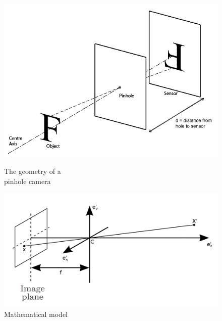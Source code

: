\begin{figure}[t!]
  \centering
  \begin{minipage}[c]{.48\textwidth}
  	\centering
    \includegraphics[width=\textwidth]{./images/tech/pinhole.png}
    \caption{The geometry of a \\ pinhole camera}
    \label{fig::pinhole}
  \end{minipage}
  \hfill
  \begin{minipage}[c]{.48\textwidth}
  	\centering
    \includegraphics[width=\textwidth]{./images/tech/image_plane.png}
    \caption{Mathematical model}
    \label{fig:math_model}
  \end{minipage}
\end{figure}

